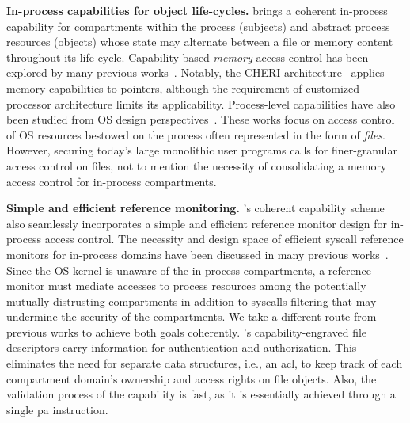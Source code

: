 \textbf{In-process capabilities for object life-cycles.}
\thename brings a coherent in-process capability for compartments within the process (subjects) and abstract process resources (objects) whose state may alternate between a file or memory content throughout its life cycle.
Capability-based \emph{memory} access control has been explored by many previous works~\cite{cheri,cheri-risc,cheriabi,lowfat-pointer,new-lowfat-pointer}.
Notably, the CHERI architecture~\cite{cheri,cheri-risc,cheriabi} applies memory capabilities to pointers, although the requirement of customized processor architecture limits its applicability.
Process-level capabilities have also been studied from OS design perspectives~\cite{obj-cap,eros,freebsd-capsicum,cap-addressing,watson2010capsicum}.
These works focus on access control of OS resources bestowed on the process often represented in the form of \emph{files}.
However, securing today's large monolithic user programs calls for finer-granular access control on files, not to mention the necessity of consolidating a memory access control for in-process compartments.

\textbf{Simple and efficient reference monitoring.} \thename's coherent capability scheme also seamlessly incorporates a simple and efficient reference monitor design for in-process access control.
The necessity and design space of efficient \gls{syscall} reference monitors for in-process domains have been discussed in many previous works~\cite{pku-pitfalls,jenny,cerberus,monguard}.
Since the OS kernel is unaware of the in-process compartments, a reference monitor must mediate accesses to process resources among the potentially mutually distrusting compartments in addition to \glspl{syscall} filtering that may undermine the security of the compartments.
We take a different route from previous works to achieve both goals coherently.
\thename's capability-engraved file descriptors carry information for authentication and authorization.
This eliminates the need for separate data structures, i.e., an \gls{acl}, to keep track of each compartment domain's ownership and access rights on file objects.
Also, the validation process of the capability is fast, as it is essentially achieved through a single \gls{pa} instruction.



